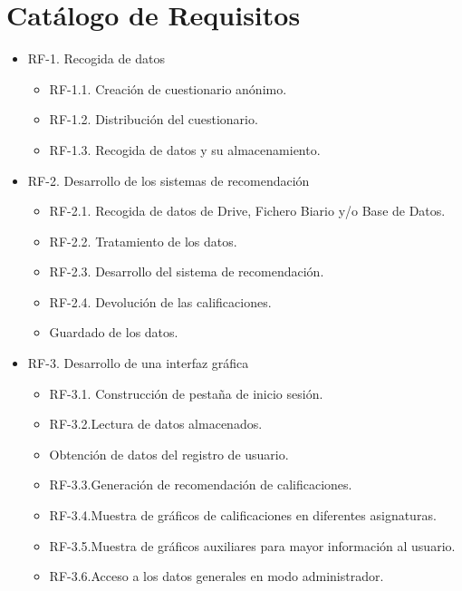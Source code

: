 \section{Catálogo de Requisitos}
\begin{itemize}
\item RF-1. Recogida de datos\\ 
\begin{itemize}
\item RF-1.1. Creación de cuestionario anónimo.\\ 
\item RF-1.2. Distribución del cuestionario. \\ 
\item RF-1.3. Recogida de datos y su almacenamiento. 
\end{itemize}

\item RF-2. Desarrollo de los sistemas de recomendación\\ 
\begin{itemize}
\item RF-2.1. Recogida de datos de Drive, Fichero Biario y/o Base de Datos. 
\item RF-2.2. Tratamiento de los datos. 
\item RF-2.3. Desarrollo del sistema de recomendación. 
\item RF-2.4. Devolución de las calificaciones. \item Guardado de los datos. 
\end{itemize}

\item RF-3. Desarrollo de una interfaz gráfica \\ 
\begin{itemize}
\item RF-3.1. Construcción de pestaña de inicio sesión.  
\item RF-3.2.Lectura de datos almacenados. \item Obtención de datos del registro de usuario. 
\item RF-3.3.Generación de recomendación de calificaciones. 
\item RF-3.4.Muestra de gráficos de calificaciones en diferentes asignaturas. 
\item RF-3.5.Muestra de gráficos auxiliares para mayor información al usuario. 
\item RF-3.6.Acceso a los datos generales en modo administrador. 
\end{itemize}

\end{itemize}

